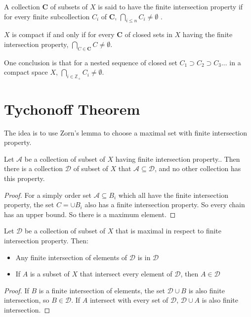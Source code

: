 \begin{definition}
    A collection $\mathbf{C}$ of subsets of $X$ is said to have the finite intersection property if for every finite subcollection $C_i$ of $\mathbf{C}$, $\bigcap_{i \leq n} C_i \neq \emptyset$ .
\end{definition}

\begin{theorem}\label{finite_intersection_in_compact_not_empty}
    $X$ is compact if and only if for every $\mathbf{C}$ of closed sets in $X$ having the finite intersection property, $\bigcap_{C \in \mathbf{C}} C \neq \emptyset$.
    
    One conclusion is that for a nested sequence of closed set $C_1 \supset C_2 \supset C_3 ...$ in a compact space $X$, $\bigcap_{i \in \mathbb{Z}_{+}} C_i \neq \emptyset$.
\end{theorem}


\section{Tychonoff Theorem}

The idea is to use Zorn's lemma to choose a maximal set with finite intersection property.

\begin{theorem}
    Let $\mathcal{A}$ be a collection of subset of $X$ having finite intersection property.. Then there is a collection $\mathcal{D}$ of subset of $X$ that $\mathcal{A} \subseteq \mathcal{D}$, and no other collection has this property.
\end{theorem}
\begin{proof}
    For a simply order set $\mathcal{A} \subseteq B_i$ which all have the finite intersection property, the set $C = \cup B_i$ also has a finite intersection property. So every chain has an upper bound. So there is a maximum element.
\end{proof}

\begin{theorem}
    Let $\mathcal{D}$ be a collection of subset of $X$ that is maximal in respect to finite intersection property. Then:
    \begin{itemize}
        \item Any finite intersection of elements of $\mathcal{D}$ is in $\mathcal{D}$
        \item If $A$ is a subset of $X$ that intersect every element of $\mathcal{D}$, then $A \in \mathcal{D}$
    \end{itemize}    
\end{theorem}
\begin{proof}
    If $B$ is a finite intersection of elements, the set $\mathcal{D} \cup B$ is also finite intersection, so $B \in \mathcal{D}$. If $A$ intersect with every set of $\mathcal{D}$, $\mathcal{D} \cup {A}$ is also finite intersection.
\end{proof}

